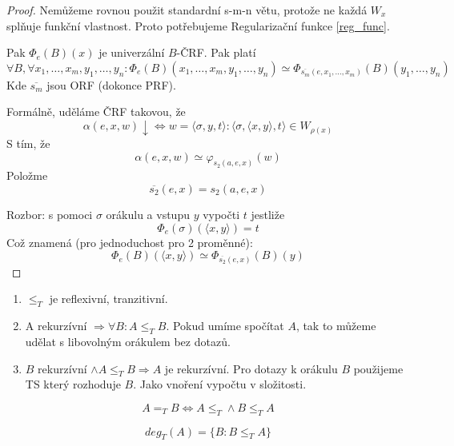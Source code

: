 \begin{theorem}\label{s_m_n_rel}
\end{theorem}
\begin{proof}
	Nemůžeme rovnou použit standardní s-m-n větu, protože ne každá $W_x$ splňuje funkční vlastnost.
	Proto potřebujeme Regularizační funkce \cref{reg_func}.

	Pak $\Phi_e(B)(x)$ je univerzální $B$-ČRF.
	Pak platí
	\[ \forall B, \forall x_1, \ldots, x_m, y_1, \ldots, y_n: \Phi_e(B)(x_1, \ldots, x_m, y_1, \ldots, y_n) \simeq \Phi_{\overline{s_m}(e, x_1, \ldots, x_m)}(B)(y_1, \ldots, y_n) \]
	Kde $\overline{s_m}$ jsou ORF (dokonce PRF).

	Formálně, uděláme ČRF takovou, že
	\[ \alpha(e, x, w) \downarrow \iff w = \langle \sigma, y, t \rangle: \langle \sigma, \langle x, y \rangle, t \rangle \in W_{\rho(x)} \]
	S tím, že
	\[ \alpha(e, x, w) \simeq \varphi_{s_2(a, e, x)}(w) \]
	Položme
	\[ \overline{s_2}(e, x) = s_2(a, e, x) \]

	Rozbor: s pomoci $\sigma$ orákulu a vstupu $y$ vypočti $t$ jestliže
	\[ \Phi_e(\sigma)(\langle x, y \rangle) = t \]
	Což znamená (pro jednoduchost pro 2 proměnné):
	\[ \Phi_e(B)(\langle x, y \rangle) \simeq \Phi_{\overline{s_2}(e, x)}(B)(y) \]
\end{proof}


\begin{note}
	\begin{enumerate}
		\item $\leq_T$ je reflexivní, tranzitivní.
		\item A rekurzívní $\Rightarrow \forall B: A \leq_T B$.
		Pokud umíme spočítat $A$, tak to můžeme udělat s libovolným orákulem bez dotazů.
		\item $B$ rekurzívní $\land A \leq_T B \Rightarrow A$ je rekurzívní.
			Pro dotazy k orákulu $B$ použijeme TS který rozhoduje $B$.
			Jako vnoření vypočtu v složitosti.
	\end{enumerate}
\end{note}

\begin{definition}
	\[ A =_T B \iff A \leq_T \land B \leq_T A \]
\end{definition}

\begin{definition}
	\[ deg_T(A) = \{ B: B \leq_T A \} \]
\end{definition}

